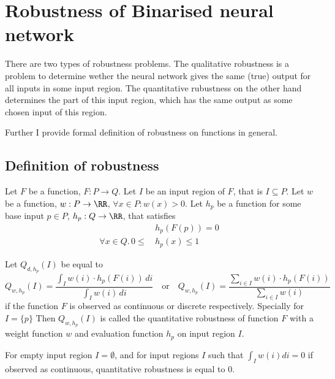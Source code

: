\section{Robustness of Binarised neural network}

There are two types of robustness problems. The qualitative robustness
is a problem to determine wether the neural network gives the same (true)
output for all inputs in some input region. The quantitative rubustness
on the other hand determines the part of this input region, which has
the same output as some chosen input of this region.

Further I provide formal definition of robustness on functions in general.

\subsection{Definition of robustness}

\begin{definition}
    Let $F$ be a function, $F: P \to Q$.
    Let $I$ be an input region of $F$, that is $I \subseteq P$.
    Let $w$ be a function, $w: P\to \RR$, $\forall x\in P: w(x) > 0$.
    Let $h_p$ be a function for some base input $p\in P$, $h_p: Q\to \RR$, that satisfies
    \begin{equation*}\begin{split}
        & h_p(F(p)) = 0 \\
        \forall x\in Q .\, 0 \leq \, & h_p(x) \leq 1 
    \end{split}\end{equation*}

    \noindent
    Let $Q_{d, h_p}(I)$ be equal to
    \begin{equation*}
        Q_{w, h_p}(I) = \frac{\int_I w(i)\cdot h_p(F(i)) \, di}{\int_I w(i) \, di}
        \hspace{1em} \text{or} \hspace{1em}
        Q_{w, h_p}(I) = \frac{\sum_{i\in I} w(i)\cdot h_p(F(i))}{\sum_{i\in I} w(i)}
    \end{equation*}
    if the function $F$ is observed as continuous or discrete respectively.
    Specially for $I=\{p\}$
    Then $Q_{w, h_p}(I)$ is called the quantitative robustness of function $F$
    with a weight function $w$ and evaluation function $h_p$ on input region $I$.

    For empty input region $I = \emptyset$,
    and for input regions $I$ such that $\int_I w(i) di = 0$ if observed as continuous,
    quantitative robustness is equal to $0$.
\end{definition}


